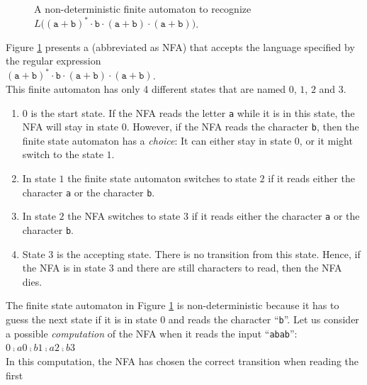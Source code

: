 \begin{figure}[!ht]
  \centering
   \caption{A non-deterministic finite automaton to recognize 
           $L\bigl((\texttt{a}+\texttt{b})^* \cdot \texttt{b} \cdot (\texttt{a}+\texttt{b}) \cdot (\texttt{a}+\texttt{b})\bigr)$.}
  \label{fig:abstarbabab-nd.dot}
\end{figure}
\noindent
Figure \ref{fig:abstarbabab-nd.dot} presents a  (abbreviated as
\textsc{NFA}) that accepts
the language specified by the regular expression
\\[0.2cm]
\hspace*{1.3cm}
$(\texttt{a}+\texttt{b})^* \cdot \texttt{b} \cdot (\texttt{a}+\texttt{b}) \cdot (\texttt{a}+\texttt{b})$.
\\[0.2cm]
This finite automaton has only 4 different states that are named $0$, $1$, $2$ and $3$.
\begin{enumerate}
\item $0$ is the start state.  If the \textsc{NFA} reads the letter \texttt{a} while it is in this
      state, the \textsc{NFA} will stay in state $0$.  However, if the \textsc{NFA} reads the
      character \texttt{b}, then the finite state automaton has a \emph{choice}:  It can either stay in state
      $0$, or it might switch to the state $1$.
\item In state $1$ the finite state automaton switches to state $2$ if it reads either the character
      \texttt{a} or the character \texttt{b}.
\item In state $2$ the \textsc{NFA} switches to state $3$ if it reads either the character
      \texttt{a} or the character \texttt{b}.
\item State  $3$ is the accepting state.  There is no transition from this state.  Hence, if the
      \textsc{NFA} is in state 3 and there are still characters to read, then the \textsc{NFA} dies.
\end{enumerate}
The finite state automaton in Figure \ref{fig:abstarbabab-nd.dot} is non-deterministic because it has
to guess the next state if it is in state $0$ and reads the character ``\texttt{b}''.  Let us consider a possible
\emph{computation} of the \textsc{NFA} when it reads the input ``\texttt{abab}'':
\\[0.2cm]
\hspace*{1.3cm}
$0 \comp{a} 0 \comp{b} 1 \comp{a} 2 \comp{b} 3$
\\[0.2cm]
In this computation, the \textsc{NFA} has chosen the correct transition when reading the first
